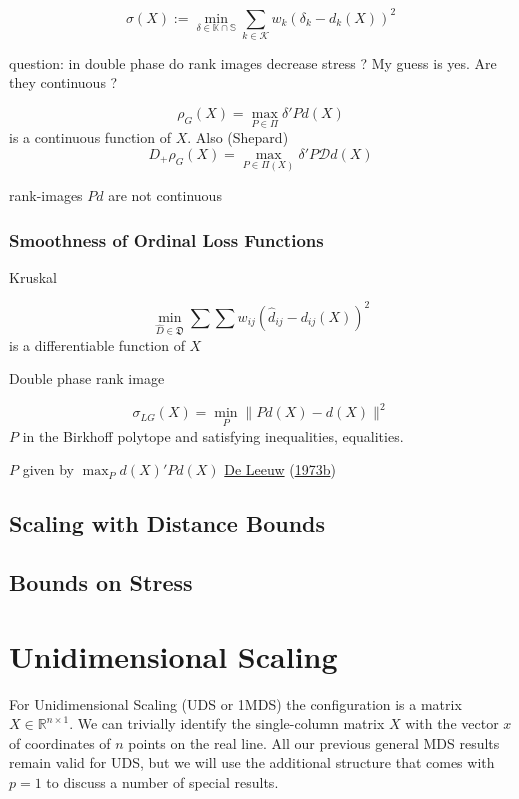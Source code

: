 \documentclass[
  12pt,
]{book}
\theoremstyle{definition}
\theoremstyle{definition}
\theoremstyle{definition}
\theoremstyle{definition}
\theoremstyle{remark}
\begin{document}
\[
\sigma(X):=\min_{\delta\in\mathbb{K}\cap\mathbb{S}}\sum_{k\in\mathcal{K}}w_k(\delta_k-d_k(X))^2
\]

question: in double phase do rank images decrease stress ? My guess is yes.
Are they continuous ?

\[\rho_G(X)=\max_{P\in\Pi} \delta'Pd(X)\] is a continuous function of \(X\). Also (Shepard)
\[
D_+\rho_G(X)=\max_{P\in\Pi(X)}\delta'P\mathcal{D}d(X)
\]

rank-images \(Pd\) are not continuous

\hypertarget{smoothness-of-ordinal-loss-functions}{%
\subsection{Smoothness of Ordinal Loss Functions}\label{smoothness-of-ordinal-loss-functions}}

Kruskal

\[
\min_{\hat D\in\mathfrak{D}}\sum\sum w_{ij}(\hat d_{ij}-d_{ij}(X))^2
\]
is a differentiable function of \(X\)

Double phase rank image

\[
\sigma_{LG}(X)=\min_P\|Pd(X)-d(X)\|^2
\]
\(P\) in the Birkhoff polytope and satisfying inequalities, equalities.

\(P\) given by \(\max_P d(X)'Pd(X)\)
\protect\hyperlink{ref-deleeuw_R_73g}{De Leeuw} (\protect\hyperlink{ref-deleeuw_R_73g}{1973b})

\hypertarget{scaling-with-distance-bounds}{%
\section{Scaling with Distance Bounds}\label{scaling-with-distance-bounds}}

\hypertarget{bounds-on-stress}{%
\section{Bounds on Stress}\label{bounds-on-stress}}

\hypertarget{unidimensional}{%
\chapter{Unidimensional Scaling}\label{unidimensional}}

For Unidimensional Scaling (UDS or 1MDS) the configuration is a matrix
\(X\in\mathbb{R}^{n\times 1}\). We can trivially identify the
single-column matrix \(X\) with the vector \(x\) of coordinates of
\(n\) points on the real line. All our previous general MDS results remain
valid for UDS, but we will use the additional structure that comes with
\(p=1\) to discuss a number of special results.
\end{document}
